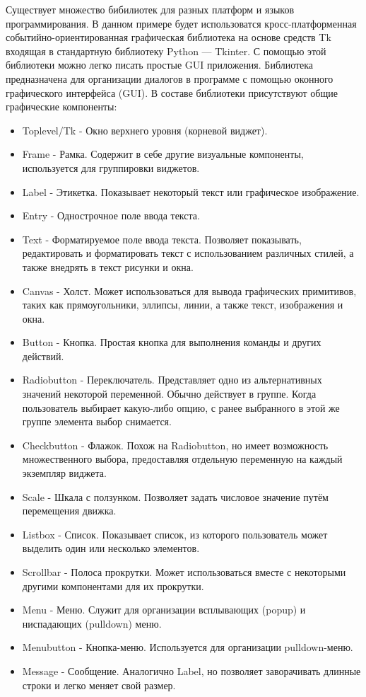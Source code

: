 \documentclass[a4paper]{article}
\begin{document}
Существует множество бибилиотек для разных платформ и языков программирования. В данном примере будет использоватся кросс-платформенная событийно-ориентированная графическая библиотека на основе средств Tk входящая в стандартную библиотеку Python --- Tkinter. С помощью этой библиотеки можно легко писать простые GUI приложения.
Библиотека предназначена для организации диалогов в программе с помощью оконного графического интерфейса (GUI). В составе библиотеки присутствуют общие графические компоненты:

\begin{itemize}
\item Toplevel/Tk - Окно верхнего уровня (корневой виджет).
\item Frame - Рамка. Содержит в себе другие визуальные компоненты, используется для группировки виджетов.
\item Label - Этикетка. Показывает некоторый текст или графическое изображение.
\item Entry - Однострочное поле ввода текста.
\item Text - Форматируемое поле ввода текста. Позволяет показывать, редактировать и форматировать текст с использованием различных стилей, а также внедрять в текст рисунки и окна.
\item Canvas - Холст. Может использоваться для вывода графических примитивов, таких как прямоугольники, эллипсы, линии, а также текст, изображения и окна.
\item Button - Кнопка. Простая кнопка для выполнения команды и других действий.
\item Radiobutton - Переключатель. Представляет одно из альтернативных значений некоторой переменной. Обычно действует в группе. Когда пользователь выбирает какую-либо опцию, с ранее выбранного в этой же группе элемента выбор снимается.
\item Checkbutton - Флажок. Похож на Radiobutton, но имеет возможность множественного выбора, предоставляя отдельную переменную на каждый экземпляр виджета.
\item Scale - Шкала с ползунком. Позволяет задать числовое значение путём перемещения движка.
\item Listbox - Список. Показывает список, из которого пользователь может выделить один или несколько элементов.
\item Scrollbar - Полоса прокрутки. Может использоваться вместе с некоторыми другими компонентами для их прокрутки.
\item Menu - Меню. Служит для организации всплывающих (popup) и ниспадающих (pulldown) меню.
\item Menubutton - Кнопка-меню. Используется для организации pulldown-меню.
\item Message - Сообщение. Аналогично Label, но позволяет заворачивать длинные строки и легко меняет свой размер.
\end{itemize}
\end{document}
